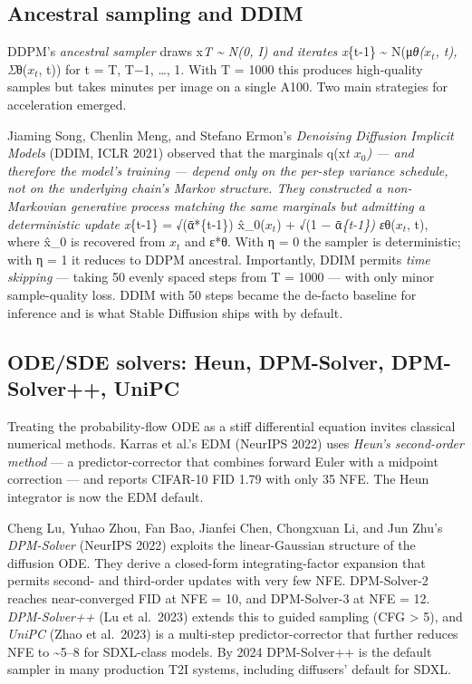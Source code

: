 \documentclass{article}
\begin{document}
\subsection{Ancestral sampling and DDIM}\label{ancestral-sampling-and-ddim}

DDPM's \emph{ancestral sampler} draws x\emph{T \textasciitilde{} N(0, I) and iterates x}\{t-1\} \textasciitilde{} N(μ\emph{θ(\(x_t\), t), Σ}θ(\(x_t\), t)) for t = T, T−1, \ldots, 1. With T = 1000 this produces high-quality samples but takes minutes per image on a single A100. Two main strategies for acceleration emerged.

Jiaming Song, Chenlin Meng, and Stefano Ermon's \emph{Denoising Diffusion Implicit Models} (DDIM, ICLR 2021) observed that the marginals q(x\emph{t \textbar{} \(x_0\)) --- and therefore the model's training --- depend only on the per-step variance schedule, not on the underlying chain's Markov structure. They constructed a non-Markovian generative process matching the same marginals but admitting a deterministic update x}\{t-1\} = √(ᾱ*\{t-1\}) x̂\_0(\(x_t\)) + √(1 − ᾱ\emph{\{t-1\}) ε}θ(\(x_t\), t), where x̂\_0 is recovered from \(x_t\) and ε*θ. With η = 0 the sampler is deterministic; with η = 1 it reduces to DDPM ancestral. Importantly, DDIM permits \emph{time skipping} --- taking 50 evenly spaced steps from T = 1000 --- with only minor sample-quality loss. DDIM with 50 steps became the de-facto baseline for inference and is what Stable Diffusion ships with by default.

\subsection{ODE/SDE solvers: Heun, DPM-Solver, DPM-Solver++, UniPC}\label{odesde-solvers-heun-dpm-solver-dpm-solver-unipc}

Treating the probability-flow ODE as a stiff differential equation invites classical numerical methods. Karras et al.'s EDM (NeurIPS 2022) uses \emph{Heun's second-order method} --- a predictor-corrector that combines forward Euler with a midpoint correction --- and reports CIFAR-10 FID 1.79 with only 35 NFE. The Heun integrator is now the EDM default.

Cheng Lu, Yuhao Zhou, Fan Bao, Jianfei Chen, Chongxuan Li, and Jun Zhu's \emph{DPM-Solver} (NeurIPS 2022) exploits the linear-Gaussian structure of the diffusion ODE. They derive a closed-form integrating-factor expansion that permits second- and third-order updates with very few NFE. DPM-Solver-2 reaches near-converged FID at NFE = 10, and DPM-Solver-3 at NFE = 12. \emph{DPM-Solver++} (Lu et al.~2023) extends this to guided sampling (CFG \textgreater{} 5), and \emph{UniPC} (Zhao et al.~2023) is a multi-step predictor-corrector that further reduces NFE to \textasciitilde5--8 for SDXL-class models. By 2024 DPM-Solver++ is the default sampler in many production T2I systems, including diffusers' default for SDXL.
\end{document}
